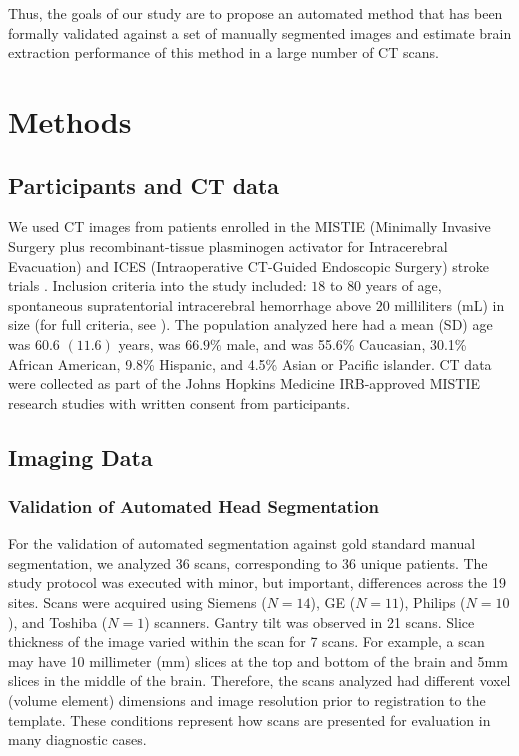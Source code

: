 \documentclass{elsarticle}\usepackage[]{graphicx}\usepackage[]{color}
\begin{document}
Thus, the goals of our study are to propose an automated method that has been formally validated against a set of manually segmented images and estimate brain extraction performance of this method in a large number of CT scans.





\section{Methods}
\subsection{ Participants and CT data}
We used CT images from patients enrolled in the MISTIE (Minimally Invasive Surgery plus recombinant-tissue plasminogen activator for Intracerebral Evacuation) and ICES (Intraoperative CT-Guided Endoscopic Surgery) stroke trials \citep{morgan_preliminary_2008}.  Inclusion criteria into the study included: $18$ to $80$ years of age, spontaneous supratentorial intracerebral hemorrhage above $20$ milliliters (mL) in size (for full criteria, see \citet{mould_minimally_2013}).  The population analyzed here had a mean (SD) age was $60.6$ $(11.6)$ years, was $66.9\%$ male, and was 55.6\% Caucasian, 30.1\% African American, 9.8\% Hispanic, and 4.5\% Asian or Pacific islander.  CT data were collected as part of the Johns Hopkins Medicine IRB-approved MISTIE research studies with written consent from participants.  


\subsection{Imaging Data}
\subsubsection{Validation of Automated Head Segmentation}
For the validation of automated segmentation against gold standard manual segmentation, we analyzed 36 scans, corresponding to 36 unique patients.  The study protocol was executed with minor, but important, differences across the 19 sites.  Scans were acquired using Siemens ($N=14$), GE ($N=11$), Philips ($N=10$), and Toshiba ($N=1$) scanners. Gantry tilt was observed in 21 scans.  Slice thickness of the image varied within the scan for 7 scans. For example, a scan may have 10 millimeter (mm) slices at the top and bottom of the brain and 5mm slices in the middle of the brain.  Therefore, the scans analyzed had different voxel (volume element) dimensions and image resolution prior to registration to the template.  These conditions represent how scans are presented for evaluation in many diagnostic cases.  
\end{document}

